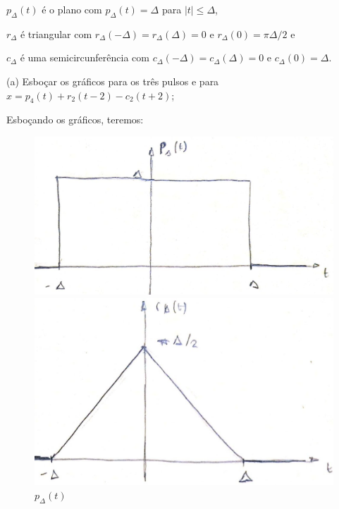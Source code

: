 \documentclass[10pt]{article}
\begin{document}
$p_{\Delta}(t)$ é o plano com $p_{\Delta}(t) = \Delta$ para $|t| \leq \Delta$,

$r_{\Delta}$ é triangular com $r_{\Delta}(-\Delta) = r_{\Delta}(\Delta) = 0$ e $r_{\Delta}(0) = \pi \Delta / 2$ e

$c_{\Delta}$ é uma semicircunferência com $c_{\Delta}(-\Delta) = c_{\Delta}(\Delta) = 0$ e $c_{\Delta}(0) = \Delta$.

\vspace{\baselineskip}

(a) Esboçar os gráficos para os três pulsos e para $x = p_4(t) + r_2(t - 2) - c_2(t + 2)$;

Esboçando os gráficos, teremos:
\begin{figure}[h]
    \begin{minipage}{9.5cm}
        \includegraphics[scale=0.2]{questao2a1.jpeg}
        \centering
        \caption{$p_{\Delta}(t)$}
    \end{minipage}
    \begin{minipage}{9cm}
        \includegraphics[scale=0.2]{questao2a2.jpeg}
        \centering

\end{minipage}
\end{figure}
\end{document}
